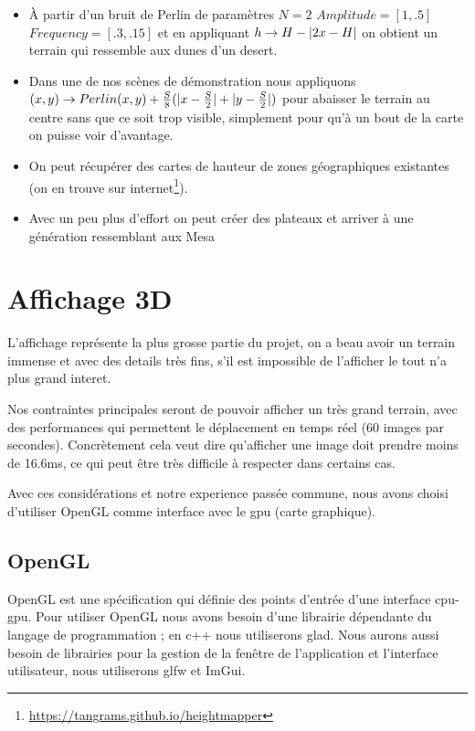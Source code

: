 \documentclass[11pt]{article} %
\DeclarePairedDelimiter\abs{\lvert}{\rvert}%
\begin{document}
\begin{itemize}
	\item{À partir d'un bruit de Perlin de paramètres $N=2$ $Amplitude=[1, .5]$ $Frequency=[.3, .15]$ et en appliquant $h\rightarrow H-\abs{2x-H}$ on obtient un terrain qui ressemble aux dunes d'un desert.}
	\item{Dans une de nos scènes de démonstration nous appliquons $(x,y)\rightarrow Perlin(x,y)+\frac{S}{8}(\abs{x-\frac{S}{2}}+\abs{y-\frac{S}{2}})$ pour abaisser le terrain au centre sans que ce soit trop visible, simplement pour qu'à un bout de la carte on puisse voir d'avantage.}
	\item{On peut récupérer des cartes de hauteur de zones géographiques existantes (on en trouve sur internet\footnote{\url{https://tangrams.github.io/heightmapper}}).}
	\item{Avec un peu plus d'effort on peut créer des plateaux et arriver à une génération ressemblant aux Mesa}
\end{itemize}








\section{Affichage 3D}

L'affichage représente la plus grosse partie du projet, on a beau avoir un terrain immense et avec des details très fins, s'il est impossible de l'afficher le tout n'a plus grand interet.

Nos contraintes principales seront de pouvoir afficher un très grand terrain, avec des performances qui permettent le déplacement en temps réel (60 images par secondes). Concrètement cela veut dire qu'afficher une image doit prendre moins de 16.6ms, ce qui peut être très difficile à respecter dans certains cas.

Avec ces considérations et notre experience passée commune, nous avons choisi d'utiliser OpenGL comme interface avec le gpu (carte graphique).

\subsection{OpenGL}

OpenGL est une spécification qui définie des points d'entrée d'une interface cpu-gpu. Pour utiliser OpenGL nous avons besoin d'une librairie dépendante du langage de programmation ; en c++ nous utiliserons glad. Nous aurons aussi besoin de librairies pour la gestion de la fenêtre de l'application et l'interface utilisateur, nous utiliserons glfw et ImGui.
\end{document}
